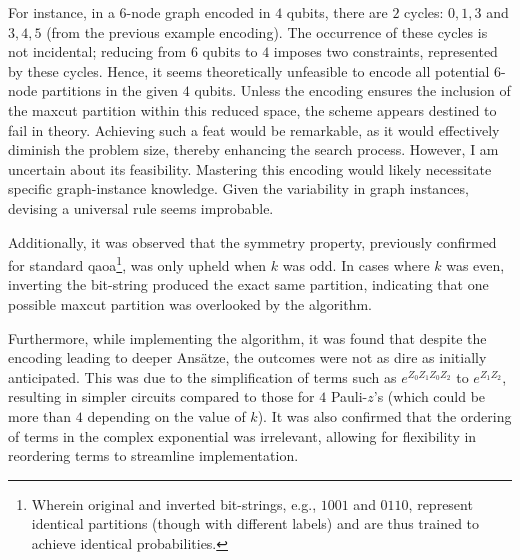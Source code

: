 For instance, in a $6$-node graph encoded in $4$ qubits, there are $2$ cycles: $0, 1, 3$ and $3, 4, 5$ (from the previous example encoding). The occurrence of these cycles is not incidental; reducing from $6$ qubits to $4$ imposes two constraints, represented by these cycles. Hence, it seems theoretically unfeasible to encode all potential $6$-node partitions in the given $4$ qubits. Unless the encoding ensures the inclusion of the \acrshort{maxcut} partition within this reduced space, the scheme appears destined to fail in theory. Achieving such a feat would be remarkable, as it would effectively diminish the problem size, thereby enhancing the search process. However, I am uncertain about its feasibility. Mastering this encoding would likely necessitate specific graph-instance knowledge. Given the variability in graph instances, devising a universal rule seems improbable.

Additionally, it was observed that the symmetry property, previously confirmed for standard \acrshort{qaoa}\footnote{Wherein original and inverted bit-strings, e.g., $1001$ and $0110$, represent identical partitions (though with different labels) and are thus trained to achieve identical probabilities.}, was only upheld when $k$ was odd. In cases where $k$ was even, inverting the bit-string produced the exact same partition, indicating that one possible \acrshort{maxcut} partition was overlooked by the algorithm.

Furthermore, while implementing the algorithm, it was found that despite the encoding leading to deeper Ansätze, the outcomes were not as dire as initially anticipated. This was due to the simplification of terms such as $e^{Z_0Z_1Z_0Z_2}$ to $e^{Z_1Z_2}$, resulting in simpler circuits compared to those for $4$ Pauli-$z$'s (which could be more than $4$ depending on the value of $k$). It was also confirmed that the ordering of terms in the complex exponential was irrelevant, allowing for flexibility in reordering terms to streamline implementation.

